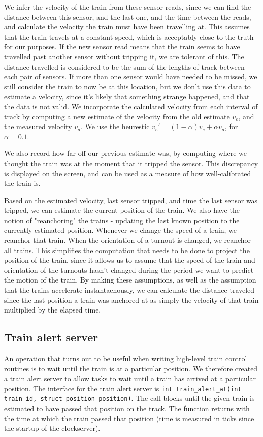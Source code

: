 \documentclass[titlepage]{article}
\begin{document}
We infer the velocity of the train from these sensor reads, since we can
find the distance between this sensor, and the last one, and the time between
the reads, and calculate the velocity the train must have been travelling at.
This assumes that the train travels at a constant speed, which is acceptably
close to the truth for our purposes.
If the new sensor read means that the train seems to have travelled past
another sensor without tripping it, we are tolerant of this.
The distance travelled is considered to be the sum of the lengths of track
between each pair of sensors.
If more than one sensor would have needed to be missed, we still consider the
train to now be at this location, but we don't use this data to estimate
a velocity, since it's likely that something strange happened, and that
the data is not valid.
We incorporate the calculated velocity from each interval of track by computing
a new estimate of the velocity from the old estimate $v_e$, and the measured
velocity $v_a$.
We use the heurestic $v_e' = (1 - \alpha) v_e + \alpha v_a$, for $\alpha = 0.1$.

We also record how far off our previous estimate was, by computing where
we thought the train was at the moment that it tripped the sensor.
This discrepancy is displayed on the screen, and can be used as a measure of
how well-calibrated the train is.

Based on the estimated velocity, last sensor tripped, and time the last sensor
was tripped, we can estimate the current position of the train.
We also have the notion of "reanchoring" the trains - updating the last
known position to the currently estimated position.
Whenever we change the speed of a train, we reanchor that train.
When the orientation of a turnout is changed, we reanchor all trains.
This simplifies the computation that needs to be done to project the position
of the train, since it allows us to assume that the speed of the train and
orientation of the turnouts hasn't changed during the period we want to predict
the motion of the train.
By making these assumptions, as well as the assumption that the trains accelerate
instantaenously, we can calculate the distance traveled since the last position
a train was anchored at as simply the velocity of that train multiplied by
the elapsed time.

\subsection{Train alert server}
An operation that turns out to be useful when writing high-level train control
routines is to wait until the train is at a particular position.
We therefore created a train alert server to allow tasks to wait until a train
has arrived at a particular position.
The interface for the train alert server is
\texttt{int train\_alert\_at(int train\_id, struct position position)}.
The call blocks until the given train is estimated to have passed that position
on the track.
The function returns with the time at which the train passed that position
(time is measured in ticks since the startup of the clockserver).
\end{document}
